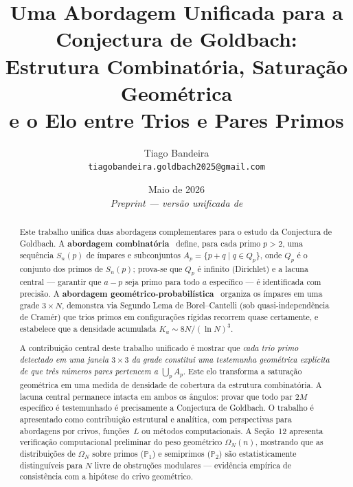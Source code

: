 \documentclass[12pt,a4paper]{article}
\title{%
	\textbf{Uma Abordagem Unificada para a Conjectura de Goldbach:}\\[4pt]
	\large Estrutura Combinat\'oria, Satura\c{c}\~ao Geom\'etrica\\
	e o Elo entre Trios e Pares Primos%
}
\author{Tiago Bandeira\\\small \texttt{tiagobandeira.goldbach2025@gmail.com}}
\date{Maio de 2026 \\ \small \emph{Preprint --- vers\~ao unificada de \cite{bandeira2026estrutura,bandeira2026geometrica}}}
\theoremstyle{remark}
\begin{document}
	
	\maketitle
	
	\begin{abstract}
		Este trabalho unifica duas abordagens complementares para o estudo da Conjectura de Goldbach.
		A \textbf{abordagem combinat\'oria}~\cite{bandeira2026estrutura} define, para cada primo $p>2$,
		uma sequ\^encia $S_n(p)$ de \'impares e subconjuntos $A_p = \{p+q \mid q \in Q_p\}$,
		onde $Q_p$ \'e o conjunto dos primos de $S_n(p)$; prova-se que $Q_p$ \'e infinito (Dirichlet)
		e a lacuna central --- garantir que $a-p$ seja primo para todo $a$ espec\'ifico --- \'e
		identificada com precis\~ao.
		A \textbf{abordagem geom\'etrico-probabil\'istica}~\cite{bandeira2026geometrica} organiza os \'impares
		em uma grade $3\times N$, demonstra via Segundo Lema de Borel--Cantelli (sob quasi-independ\^encia
		de Cram\'er) que trios primos em configura\c{c}\~oes r\'igidas recorrem quase certamente,
		e estabelece que a densidade acumulada $K_u \sim 8N/(\ln N)^3$.
		
		A contribui\c{c}\~ao central deste trabalho unificado \'e mostrar que
		\emph{cada trio primo detectado em uma janela $3\times 3$ da grade constitui uma
			testemunha geom\'etrica expl\'icita de que tr\^es n\'umeros pares pertencem a $\bigcup_p A_p$}.
		Este elo transforma a satura\c{c}\~ao geom\'etrica em uma medida de densidade de cobertura
		da estrutura combinat\'oria. A lacuna central permanece intacta em ambos os \^angulos:
		provar que todo par $2M$ espec\'ifico \'e testemunhado \'e precisamente a Conjectura
		de Goldbach. O trabalho \'e apresentado como contribui\c{c}\~ao estrutural e anal\'itica,
		com perspectivas para abordagens por crivos, fun\c{c}\~oes~$L$ ou m\'etodos computacionais.
		A Se\c{c}\~ao~12 apresenta verifica\c{c}\~ao computacional preliminar do peso geom\'etrico
		$\Omega_N(n)$, mostrando que as distribui\c{c}\~oes de $\Omega_N$ sobre primos ($\mathbb{P}_1$)
		e semiprimos ($\mathbb{P}_2$) s\~ao estatisticamente distingu\'iveis para $N$ livre de
		obstru\c{c}\~oes modulares --- evid\^encia emp\'irica de consist\^encia com a hip\'otese do
		crivo geom\'etrico.
	\end{abstract}
\end{document}
